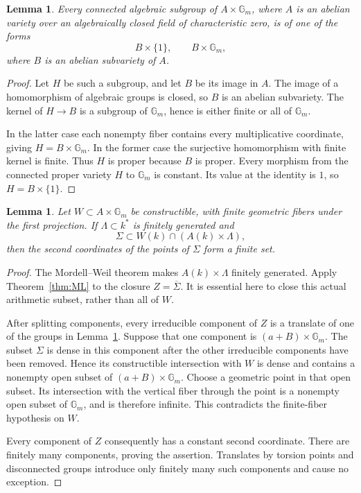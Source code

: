 \documentclass[11pt,a4paper]{article}
\newtheorem{lemma}[theorem]{Lemma}
\theoremstyle{definition}
\newcommand{\Gm}{\mathbb G_m}\newcommand{\Ok}{\mathcal O_k}
\begin{document}
\begin{lemma}\label{lem:subgroups}
Every connected algebraic subgroup of $A\times\Gm$, where $A$
is an abelian variety over an algebraically closed field of
characteristic zero, is of one of the forms
\[
                         B\times\{1\},\qquad B\times\Gm,
\]
where $B$ is an abelian subvariety of $A$.
\end{lemma}
\begin{proof}
Let $H$ be such a subgroup, and let $B$ be its image in $A$.
The image of a homomorphism of algebraic groups is closed, so $B$
is an abelian subvariety. The kernel of $H\to B$ is a subgroup
of $\Gm$, hence is either finite or all of $\Gm$.

In the latter case each nonempty fiber contains every multiplicative
coordinate, giving $H=B\times\Gm$. In the former case the
surjective homomorphism with finite kernel is finite. Thus $H$ is
proper because $B$ is proper. Every morphism from the connected
proper variety $H$ to $\Gm$ is constant. Its value at the identity
is $1$, so $H=B\times\{1\}$.
\end{proof}

\begin{lemma}\label{lem:constructible}
Let $W\subset A\times\Gm$ be constructible, with finite geometric
fibers under the first projection. If $\Lambda\subset k^*$ is
finitely generated and
\[
                  \Sigma\subset W(k)\cap(A(k)\times\Lambda),
\]
then the second coordinates of the points of $\Sigma$ form a finite
set.
\end{lemma}
\begin{proof}
The Mordell--Weil theorem makes $A(k)\times\Lambda$ finitely
generated. Apply Theorem~\ref{thm:ML} to the closure
$Z=\overline\Sigma$. It is essential here to close this actual
arithmetic subset, rather than all of $W$.

After splitting components, every irreducible component of $Z$
is a translate of one of the groups in Lemma~\ref{lem:subgroups}.
Suppose that one component is $(a+B)\times\Gm$. The subset
$\Sigma$ is dense in this component after the other irreducible
components have been removed. Hence its constructible intersection
with $W$ is dense and contains a nonempty open subset of
$(a+B)\times\Gm$. Choose a geometric point in that open subset.
Its intersection with the vertical fiber through the point is a
nonempty open subset of $\Gm$, and is therefore infinite. This
contradicts the finite-fiber hypothesis on $W$.

Every component of $Z$ consequently has a constant second
coordinate. There are finitely many components, proving the
assertion. Translates by torsion points and disconnected groups
introduce only finitely many such components and cause no exception.
\end{proof}
\end{document}
